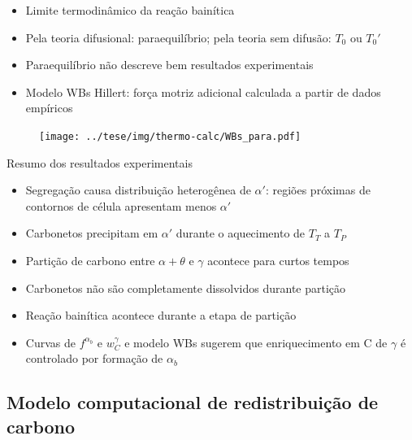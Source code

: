 \begin{frame}
  \begin{itemize}
    \item Limite termodinâmico da reação bainítica
    \item Pela teoria difusional: paraequilíbrio; pela teoria sem difusão: $T_0$ ou $T_0'$
    \item Paraequilíbrio não descreve bem resultados experimentais
    \item Modelo WBs Hillert\footnotemark[1]: força motriz adicional calculada a partir de dados empíricos
  \end{itemize}

  \begin{figure}
    \texttt{[image: ../tese/img/thermo-calc/WBs\_para.pdf]}
  \end{figure}

\end{frame}


\begin{frame}{Resumo dos resultados experimentais}
  \begin{itemize}
    \item Segregação causa distribuição heterogênea de $\alpha'$: regiões próximas de contornos de célula apresentam menos $\alpha'$
    \item Carbonetos precipitam em $\alpha'$ durante o aquecimento de $T_T$ a $T_P$
    \item Partição de carbono entre $\alpha + \theta$ e $\gamma$ acontece para curtos tempos
    \item Carbonetos não são completamente dissolvidos durante partição
    \item Reação bainítica acontece durante a etapa de partição
    \item Curvas de $f^{\alpha_b}$ e $w_C^\gamma$ e modelo WBs sugerem que enriquecimento em C de $\gamma$ é controlado por formação de $\alpha_b$
  \end{itemize}
\end{frame}




\subsection{Modelo computacional de redistribuição de carbono}


